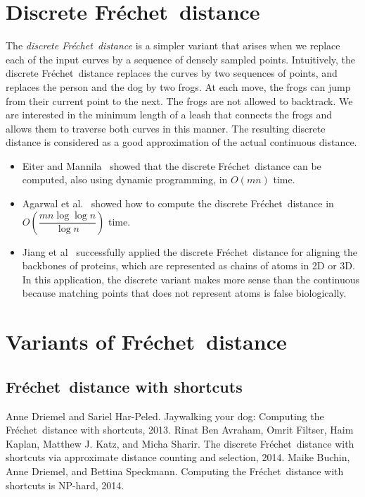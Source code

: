 \documentclass[a4paper,onecolumn]{article}
\numberwithin{equation}{section}
\numberwithin{figure}{section}
\numberwithin{algorithm}{section}
\theoremstyle{plain}
\theoremstyle{definition}
\theoremstyle{remark}
\newcommand{\frechet}{Fr\'echet}
\begin{document}
\section{Discrete \frechet\ distance}
The \emph{discrete \frechet\ distance} is a simpler variant that arises when we
replace each of the input curves by a sequence of densely sampled points.
Intuitively, the discrete \frechet\ distance 
replaces the curves by two sequences of points, and replaces the person and the dog by
two frogs. At each move, the frogs can jump from their current point to the next. The frogs are
not allowed to backtrack. We are interested in the minimum length
of a leash that connects the frogs and allows them to traverse both curves in this manner.
The resulting discrete distance is considered as a good approximation of the actual continuous distance.
\begin{itemize}
\item Eiter and Mannila~\cite{EiterM94} showed that the discrete \frechet\ distance can be computed, also using dynamic programming, in $O(mn)$ time.
\item Agarwal et al.~\cite{AgarwalAKS14} showed how to compute the discrete \frechet\ distance in $O\left(\dfrac{mn\log\log n}{\log n}\right)$ time.
\item Jiang et al~\cite{JiangXZ08} successfully applied the discrete \frechet\ distance for aligning the backbones of proteins, which are represented as chains of atoms in 2D or 3D. In this application, the discrete variant makes more sense than the continuous because matching points that does not represent atoms is false biologically.    
\end{itemize}

\section{Variants of \frechet\ distance}

\subsection{\frechet\ distance with shortcuts}

Anne Driemel and Sariel Har-Peled. Jaywalking your dog: Computing the \frechet\ distance with shortcuts, 2013.
Rinat Ben Avraham, Omrit Filtser, Haim Kaplan, Matthew J. Katz, and Micha Sharir. The discrete \frechet\ distance with shortcuts via approximate distance counting and selection, 2014.
Maike Buchin, Anne Driemel, and Bettina Speckmann. Computing the \frechet\ distance with shortcuts is NP-hard, 2014.
\end{document}
